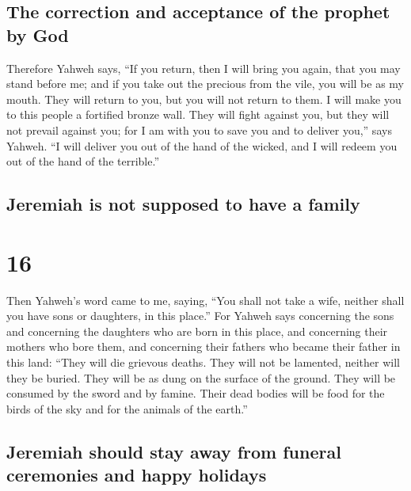 \hypertarget{the-correction-and-acceptance-of-the-prophet-by-god}{%
\subsection{The correction and acceptance of the prophet by
God}\label{the-correction-and-acceptance-of-the-prophet-by-god}}

 Therefore Yahweh says, ``If you return, then I will
bring you again, that you may stand before me; and if you take out the
precious from the vile, you will be as my mouth. They will return to
you, but you will not return to them.  I will make you to
this people a fortified bronze wall. They will fight against you, but
they will not prevail against you; for I am with you to save you and to
deliver you,'' says Yahweh.  ``I will deliver you out of
the hand of the wicked, and I will redeem you out of the hand of the
terrible.''

\hypertarget{jeremiah-is-not-supposed-to-have-a-family}{%
\subsection{Jeremiah is not supposed to have a
family}\label{jeremiah-is-not-supposed-to-have-a-family}}

\hypertarget{section-15}{%
\section{16}\label{section-15}}

 Then Yahweh's word came to me, saying, 
``You shall not take a wife, neither shall you have sons or daughters,
in this place.''  For Yahweh says concerning the sons and
concerning the daughters who are born in this place, and concerning
their mothers who bore them, and concerning their fathers who became
their father in this land:  ``They will die grievous
deaths. They will not be lamented, neither will they be buried. They
will be as dung on the surface of the ground. They will be consumed by
the sword and by famine. Their dead bodies will be food for the birds of
the sky and for the animals of the earth.''

\hypertarget{jeremiah-should-stay-away-from-funeral-ceremonies-and-happy-holidays}{%
\subsection{Jeremiah should stay away from funeral ceremonies and happy
holidays}\label{jeremiah-should-stay-away-from-funeral-ceremonies-and-happy-holidays}}

